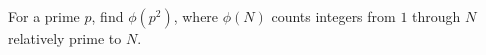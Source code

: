 For a prime $p$, find $\phi(p^2)$, where $\phi(N)$ counts integers from $1$ through $N$ relatively prime to $N$.
